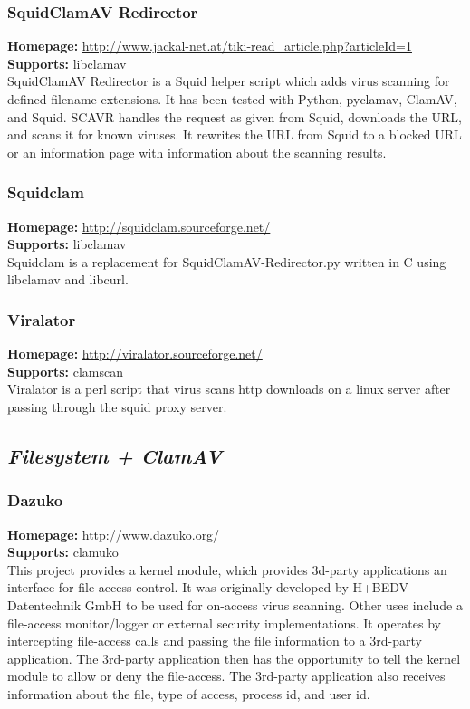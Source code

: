 \documentclass[a4paper,titlepage,12pt]{article}
\begin{document}
    \subsubsection{SquidClamAV Redirector}
    \textbf{Homepage:} \url{http://www.jackal-net.at/tiki-read_article.php?articleId=1}\\
    \textbf{Supports:} libclamav\\[4pt]
    SquidClamAV Redirector is a Squid helper script which adds virus scanning
    for defined filename extensions. It has been tested with Python, pyclamav,
    ClamAV, and Squid. SCAVR handles the request as given from Squid, downloads
    the URL, and scans it for known viruses. It rewrites the URL from Squid to
    a blocked URL or an information page with information about the scanning
    results.

    \subsubsection{Squidclam}
    \textbf{Homepage:} \url{http://squidclam.sourceforge.net/}\\
    \textbf{Supports:} libclamav\\[4pt]
    Squidclam is a replacement for SquidClamAV-Redirector.py written in C
    using libclamav and libcurl.

    \subsubsection{Viralator}
    \textbf{Homepage:} \url{http://viralator.sourceforge.net/}\\
    \textbf{Supports:} clamscan\\[4pt]
    Viralator is a perl script that virus scans http downloads on a linux
    server after passing through the squid proxy server.

    \subsection{\emph{Filesystem + ClamAV}}

    \subsubsection{Dazuko}
    \textbf{Homepage:} \url{http://www.dazuko.org/}\\
    \textbf{Supports:} clamuko\\[4pt]
    This project provides a kernel module, which provides 3d-party applications
    an interface for file access control. It was originally developed by H+BEDV
    Datentechnik GmbH to be used for on-access virus scanning. Other uses
    include a file-access monitor/logger or external security implementations.
    It operates by intercepting file-access calls and passing the file
    information to a 3rd-party application. The 3rd-party application then has
    the opportunity to tell the kernel module to allow or deny the file-access.
    The 3rd-party application also receives information about the file, type
    of access, process id, and user id.
\end{document}
